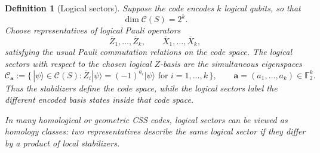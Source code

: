 \documentclass[10pt]{article}
\theoremstyle{compactdef}
\newtheorem{definition}{Definition}
\begin{document}
\begin{definition}[Logical sectors]
Suppose the code encodes $k$ logical qubits, so that
\[
\dim \mathcal C(S)=2^k.
\]
Choose representatives of logical Pauli operators
\[
\overline Z_1,\dots,\overline Z_k,
\qquad
\overline X_1,\dots,\overline X_k,
\]
satisfying the usual Pauli commutation relations on the code space. The \emph{logical sectors} with respect to the chosen logical $Z$-basis are the simultaneous eigenspaces
\[
\mathcal C_{\mathbf a}:=
\{\,|\psi\rangle\in \mathcal C(S):
\overline Z_i|\psi\rangle=(-1)^{a_i}|\psi\rangle
\text{ for }i=1,\dots,k\,\},
\qquad
\mathbf a=(a_1,\dots,a_k)\in \mathbb F_2^k.
\]
Thus the stabilizers define the code space, while the logical sectors label the different encoded basis states inside that code space.

In many homological or geometric CSS codes, logical sectors can be viewed as \emph{homology classes}: two representatives describe the same logical sector if they differ by a product of local stabilizers.
\end{definition}
\end{document}
